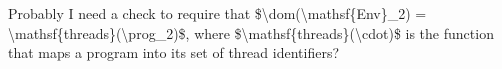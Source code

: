 \documentclass[a4paper,UKenglish]{article}%
\theoremstyle{plain}
\begin{document}
\ac{Probably I need a check to require that $\dom(\mathsf{Env}_2) = \mathsf{threads}(\prog_2)$, 
where $\mathsf{threads}(\cdot)$ is the function that maps a program into its set of thread identifiers?}
%
%
%
\end{document}

